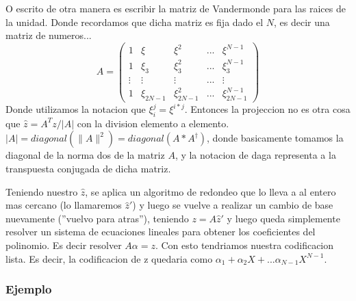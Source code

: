 \documentclass[12pt, oneside]{article}
\begin{document}
O escrito de otra manera es escribir la matriz de Vandermonde para las raices de la unidad.
Donde recordamos que dicha matriz es fija dado el $N$, es decir una matriz de numeros...
\begin{equation*}
    A=
    \begin{pmatrix}
        1 & \xi &  \xi^2 & ... & \xi^{N-1} \\
        1 & \xi_3 & \xi_3^2 & ... & \xi_3^{N-1}\\
        \vdots & \vdots & \vdots & ... & \vdots\\
        1 & \xi_{2N-1} & \xi_{2N-1}^2 & ... & \xi_{2N-1}^{N-1}
    \end{pmatrix}
    \label{eq:vandermonde}
\end{equation*}
Donde utilizamos la notacion que $\xi_i^j=\xi^{i*j}$.
Entonces la projeccion no es otra cosa que $\hat{z} = A^Tz/|A|$ con la division
elemento a elemento.
$|A|=diagonal(\parallel A\parallel^2)= diagonal(A*A^\dagger)$, donde basicamente tomamos la diagonal de
la norma dos de la matriz $A$, y la notacion de daga representa a la transpuesta conjugada de dicha matriz.


Teniendo nuestro $\hat{z}$, se aplica un algoritmo de redondeo que lo lleva a al entero mas cercano
(lo llamaremos $\hat{z}'$) y luego se vuelve a realizar un cambio de base nuevamente (''vuelvo
para atras''),
teniendo $z = A\hat{z}'$ y luego queda simplemente resolver un sistema de ecuaciones lineales para
obtener los coeficientes del polinomio.
Es decir resolver $A\alpha=z$.
Con esto tendriamos nuestra codificacion lista.
Es decir, la codificacion de z quedaria como $\alpha_1 + \alpha_2 X + ... \alpha_{N-1}X^{N-1}$.

\subsubsection{Ejemplo}
\end{document}
